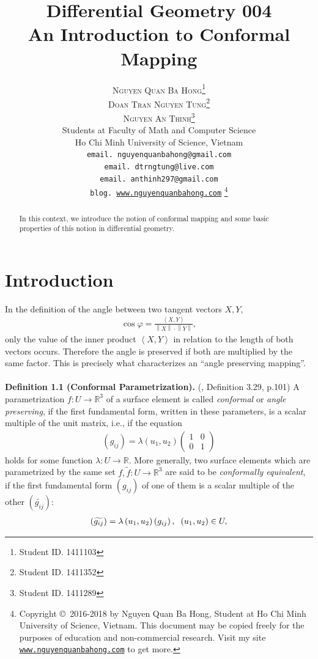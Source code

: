 \documentclass[a4paper]{article}
\title{\huge Differential Geometry 004\\
An Introduction to Conformal Mapping}
\author{\textsc{Nguyen Quan Ba Hong}\footnote{Student ID. 1411103}\\
\textsc{Doan Tran Nguyen Tung}\footnote{Student ID. 1411352}\\
\textsc{Nguyen An Thinh}\footnote{Student ID. 1411289}\\
{\small Students at Faculty of Math and Computer Science}\\ 
{\small Ho Chi Minh University of Science, Vietnam} \\
{\small \texttt{email. nguyenquanbahong@gmail.com}}\\
{\small \texttt{email. dtrngtung@live.com}}\\
{\small \texttt{email. anthinh297@gmail.com}}\\
{\small \texttt{blog. \url{www.nguyenquanbahong.com}} 
\footnote{Copyright \copyright\ 2016-2018 by Nguyen Quan Ba Hong, Student at Ho Chi Minh University of Science, Vietnam. This document may be copied freely for the purposes of education and non-commercial research. Visit my site \texttt{\url{www.nguyenquanbahong.com}} to get more.}}}
\numberwithin{equation}{section}
\begin{document}
\maketitle
\begin{abstract}
In this context, we introduce the notion of conformal mapping and some basic properties  of this notion in differential geometry.
\end{abstract}
\newpage
\tableofcontents
\newpage
\section{Introduction}
In the definition of the angle between two tangent vectors $X,Y$,
\begin{align}
\cos \varphi  = \frac{{\left\langle {X,Y} \right\rangle }}{{\left\| X \right\| \cdot \left\| Y \right\|}},
\end{align}
only the value of the inner product $\left\langle {X,Y} \right\rangle $ in relation to the length of both vectors occurs. Therefore the angle is preserved if both are multiplied by the same factor. This is precisely what characterizes an ``angle preserving mapping''.\\
\\
\textbf{Definition 1.1 (Conformal Parametrization).} (\cite{1}, Definition 3.29, p.101) A parametrization $f:U\to \mathbb{R}^3$ of a surface element is called \textit{conformal} or \textit{angle preserving}, if the first fundamental form, written in these parameters, is a scalar multiple of the unit matrix, i.e., if the equation
\begin{align}
\left( {{g_{ij}}} \right) = \lambda \left( {{u_1},{u_2}} \right)\left( {\begin{array}{*{20}{c}}
1&0\\
0&1
\end{array}} \right)
\end{align} 
holds for some function $\lambda :U\to \mathbb{R}$. More generally, two surface elements which are parametrized by the same set $f, \widetilde{f}: U\to \mathbb{R}^3$ are said to be \textit{conformally equivalent}, if the first fundamental form $\left(g_{ij}\right)$ of one of them is a scalar multiple of the other $\left(\widetilde{g_{ij}}\right)$:
\begin{align}
\label{1.3}
\left( {\widetilde {{g_{ij}}}} \right) = \lambda \left( {{u_1},{u_2}} \right)\left( {{g_{ij}}} \right),\hspace{0.2cm}\left( {{u_1},{u_2}} \right) \in U,
\end{align}
\end{document}
